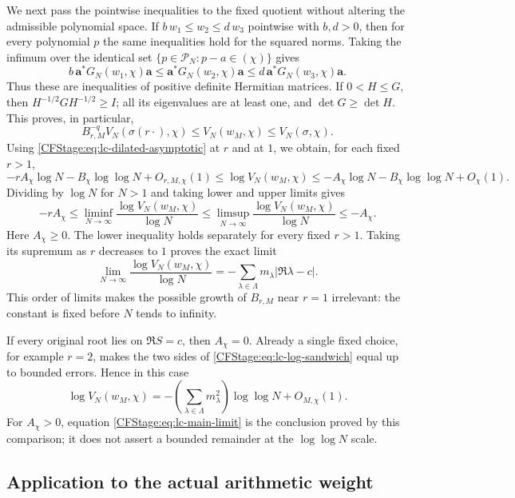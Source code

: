 We next pass the pointwise inequalities to the fixed quotient without
altering the admissible polynomial space. If $b\,w_1\le w_2\le d\,w_3$
pointwise with $b,d>0$, then for every polynomial $p$ the same inequalities
hold for the squared norms. Taking the infimum over the identical set
$\{p\in\mathcal P_N:p-a\in(\chi)\}$ gives
\[
 b\,\boldsymbol a^*G_N(w_1,\chi)\boldsymbol a
 \le\boldsymbol a^*G_N(w_2,\chi)\boldsymbol a
 \le d\,\boldsymbol a^*G_N(w_3,\chi)\boldsymbol a.
\]
Thus these are inequalities of positive definite Hermitian matrices.
If $0<H\le G$, then $H^{-1/2}GH^{-1/2}\ge I$; all its eigenvalues are
at least one, and $\det G\ge\det H$. This proves, in particular,
\[
 B_{r,M}^{-q}V_N(\sigma(r\cdot),\chi)
 \le V_N(w_M,\chi)\le V_N(\sigma,\chi).
 \tag{LC.20}\label{CFStage:eq:lc-volume-sandwich}
\]
Using \eqref{CFStage:eq:lc-dilated-asymptotic} at $r$ and at $1$, we obtain, for
each fixed $r>1$,
\[
 -rA_\chi\log N-B_\chi\log\log N+O_{r,M,\chi}(1)
 \le\log V_N(w_M,\chi)
 \le-A_\chi\log N-B_\chi\log\log N+O_\chi(1).
 \tag{LC.21}\label{CFStage:eq:lc-log-sandwich}
\]
Dividing by $\log N$ for $N>1$ and taking lower and upper limits gives
\[
 -rA_\chi
 \le\liminf_{N\to\infty}\frac{\log V_N(w_M,\chi)}{\log N}
 \le\limsup_{N\to\infty}\frac{\log V_N(w_M,\chi)}{\log N}
 \le-A_\chi.
\]
Here $A_\chi\ge0$. The lower inequality holds separately for every fixed
$r>1$. Taking its supremum as $r$ decreases to $1$ proves the exact limit
\[
 \boxed{\displaystyle
 \lim_{N\to\infty}\frac{\log V_N(w_M,\chi)}{\log N}
 =-\sum_{\lambda\in\Lambda}m_\lambda|\Re\lambda-c|.}
 \tag{LC.22}\label{CFStage:eq:lc-main-limit}
\]
This order of limits makes the possible growth of $B_{r,M}$ near $r=1$
irrelevant: the constant is fixed before $N$ tends to infinity.

If every original root lies on $\Re S=c$, then $A_\chi=0$. Already a single
fixed choice, for example $r=2$, makes the two sides of
\eqref{CFStage:eq:lc-log-sandwich} equal up to bounded errors. Hence in this case
\[
 \boxed{\displaystyle
 \log V_N(w_M,\chi)
 =-\left(\sum_{\lambda\in\Lambda}m_\lambda^2\right)
 \log\log N+O_{M,\chi}(1).}
 \tag{LC.23}\label{CFStage:eq:lc-critical-law}
\]
For $A_\chi>0$, equation \eqref{CFStage:eq:lc-main-limit} is the conclusion proved
by this comparison; it does not assert a bounded remainder at the
$\log\log N$ scale.

\subsection{Application to the actual arithmetic weight}

